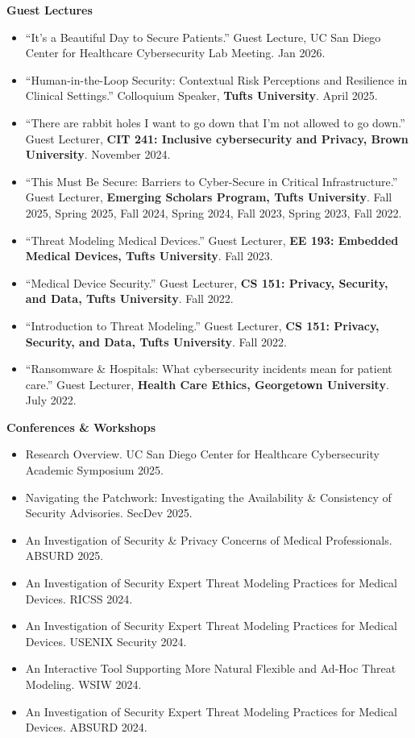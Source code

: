 \documentclass[10pt,letterpaper]{article}
\begin{document}
\textbf{Guest Lectures}
\begin{itemize}[leftmargin=*, itemsep=0.2em]
    \item ``It's a Beautiful Day to Secure Patients.'' Guest Lecture, UC San Diego Center for Healthcare Cybersecurity Lab Meeting. Jan 2026.
    \item ``Human-in-the-Loop Security: Contextual Risk Perceptions and Resilience in Clinical Settings.'' Colloquium Speaker, \textbf{Tufts University}. April 2025.
    \item ``There are rabbit holes I want to go down that I’m not allowed to go down.'' Guest Lecturer, \textbf{CIT 241: Inclusive cybersecurity and Privacy, Brown University}. November 2024.
    \item ``This Must Be Secure: Barriers to Cyber-Secure in Critical Infrastructure.'' Guest Lecturer, \textbf{Emerging Scholars Program, Tufts University}. Fall 2025, Spring 2025, Fall 2024, Spring 2024, Fall 2023, Spring 2023, Fall 2022.
    \item ``Threat Modeling Medical Devices.'' Guest Lecturer, \textbf{EE 193: Embedded Medical Devices, Tufts University}. Fall 2023.
    \item ``Medical Device Security.'' Guest Lecturer, \textbf{CS 151: Privacy, Security, and Data, Tufts University}. Fall 2022.
    \item ``Introduction to Threat Modeling.'' Guest Lecturer, \textbf{CS 151: Privacy, Security, and Data, Tufts University}. Fall 2022.
    \item ``Ransomware \& Hospitals: What cybersecurity incidents mean for patient care.'' Guest Lecturer, \textbf{Health Care Ethics, Georgetown University}. July 2022.
\end{itemize}

\textbf{Conferences \& Workshops}
\begin{itemize}[leftmargin=*, itemsep=0.2em]
    \item Research Overview. UC San Diego Center for Healthcare Cybersecurity Academic Symposium 2025.
    \item Navigating the Patchwork: Investigating the Availability \& Consistency of Security Advisories. SecDev 2025.
    \item An Investigation of Security \& Privacy Concerns of Medical Professionals. ABSURD  2025.
    \item An Investigation of Security Expert Threat Modeling Practices for Medical Devices. RICSS 2024.
    \item An Investigation of Security Expert Threat Modeling Practices for Medical Devices. USENIX Security 2024.
    \item An Interactive Tool Supporting More Natural Flexible and Ad-Hoc Threat Modeling. WSIW 2024.
    \item An Investigation of Security Expert Threat Modeling Practices for Medical Devices. ABSURD 2024.
\end{itemize}
\end{document}
